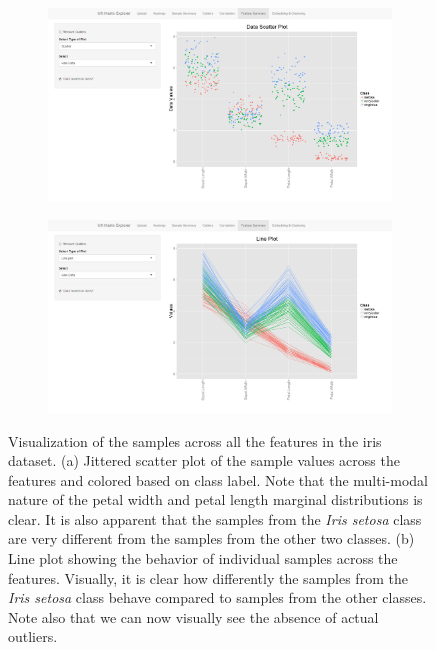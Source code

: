 \documentclass[12pt]{article}
\begin{document}
\begin{figure}
	\centering
	\begin{subfigure}[b]{0.8\textwidth}
		\includegraphics[width=\textwidth]{Figures/Iris/ScatterColor_Raw.png}
		\subcaption{}
		\label{fig:FigScatter}
	\end{subfigure}
	\begin{subfigure}[b]{0.8\textwidth}
		\includegraphics[width=\textwidth]{Figures/Iris/LineColor_Raw.png}
		\subcaption{}
		\label{fig:FigLine}
	\end{subfigure}
	\caption{Visualization of the samples across all the features in the iris dataset. (a) Jittered scatter plot of the sample values across the features and colored based on class label. Note that the multi-modal nature of the petal width and petal length marginal distributions is clear. It is also apparent that the samples from the \textit{Iris setosa} class are very different from the samples from the other two classes. (b) Line plot showing the behavior of individual samples across the features. Visually, it is clear how differently the samples from the \textit{Iris setosa} class behave compared to samples from the other classes. Note also that we can now visually see the absence of actual outliers.}
	\label{fig:FigFeature}
\end{figure}
\end{document}
